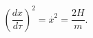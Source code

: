 \begin{equation}
\left( \frac{dx}{d\tau }\right) ^{2}=\stackrel{.}{x}^{2}=\frac{2H}{m}.
\end{equation}

